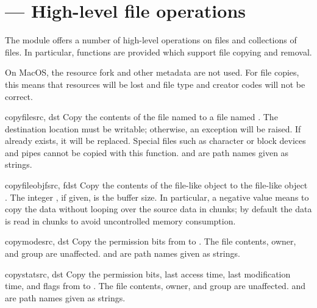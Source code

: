 \section{ ---
         High-level file operations}



The  module offers a number of high-level operations on
files and collections of files.  In particular, functions are provided 
which support file copying and removal.

  On MacOS, the resource fork and other metadata are
not used.  For file copies, this means that resources will be lost and 
file type and creator codes will not be correct.


\begin{funcdesc}{copyfile}{src, dst}
  Copy the contents of the file named  to a file named
  .  The destination location must be writable; otherwise, 
  an  exception will be raised.
  If  already exists, it will be replaced.  
  Special files such as character or block devices
  and pipes cannot be copied with this function.   and
   are path names given as strings.
\end{funcdesc}

\begin{funcdesc}{copyfileobj}{fsrc, fdst}
  Copy the contents of the file-like object  to the
  file-like object .  The integer , if given,
  is the buffer size. In particular, a negative  value
  means to copy the data without looping over the source data in
  chunks; by default the data is read in chunks to avoid uncontrolled
  memory consumption.
\end{funcdesc}

\begin{funcdesc}{copymode}{src, dst}
  Copy the permission bits from  to .  The file
  contents, owner, and group are unaffected.   and 
  are path names given as strings.
\end{funcdesc}

\begin{funcdesc}{copystat}{src, dst}
  Copy the permission bits, last access time, last modification time,
  and flags from  to .  The file contents, owner, and
  group are unaffected.   and  are path names given
  as strings.
\end{funcdesc}

